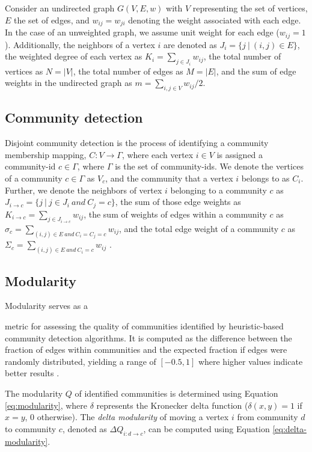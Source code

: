 Consider an undirected graph $G(V, E, w)$ with $V$ representing the set of vertices, $E$ the set of edges, and $w_{ij} = w_{ji}$ denoting the weight associated with each edge. In the case of an unweighted graph, we assume unit weight for each edge ($w_{ij} = 1$). Additionally, the neighbors of a vertex $i$ are denoted as $J_i = \{j\ |\ (i, j) \in E\}$, the weighted degree of each vertex as $K_i = \sum_{j \in J_i} w_{ij}$, the total number of vertices as $N = |V|$, the total number of edges as $M = |E|$, and the sum of edge weights in the undirected graph as $m = \sum_{i, j \in V} w_{ij}/2$.




\subsection{Community detection}

Disjoint community detection is the process of identifying a community membership mapping, $C: V \rightarrow \Gamma$, where each vertex $i \in V$ is assigned a community-id $c \in \Gamma$, where $\Gamma$ is the set of community-ids. We denote the vertices of a community $c \in \Gamma$ as $V_c$, and the community that a vertex $i$ belongs to as $C_i$. Further, we denote the neighbors of vertex $i$ belonging to a community $c$ as $J_{i \rightarrow c} = \{j\ |\ j \in J_i\ and\ C_j = c\}$, the sum of those edge weights as $K_{i \rightarrow c} = \sum_{j \in J_{i \rightarrow c}} w_{ij}$, the sum of weights of edges within a community $c$ as $\sigma_c = \sum_{(i, j) \in E\ and\ C_i = C_j = c} w_{ij}$, and the total edge weight of a community $c$ as $\Sigma_c = \sum_{(i, j) \in E\ and\ C_i = c} w_{ij}$ \cite{com-leskovec21}.




\subsection{Modularity}

Modularity serves as a metric for assessing the quality of communities identified by heuristic-based community detection algorithms. It is computed as the difference between the fraction of edges within communities and the expected fraction if edges were randomly distributed, yielding a range of $[-0.5, 1]$ where higher values indicate better results \cite{com-brandes07}. The modularity $Q$ of identified communities is determined using Equation \ref{eq:modularity}, where $\delta$ represents the Kronecker delta function ($\delta (x,y)=1$ if $x=y$, $0$ otherwise). The \textit{delta modularity} of moving a vertex $i$ from community $d$ to community $c$, denoted as $\Delta Q_{i: d \rightarrow c}$, can be computed using Equation \ref{eq:delta-modularity}.

